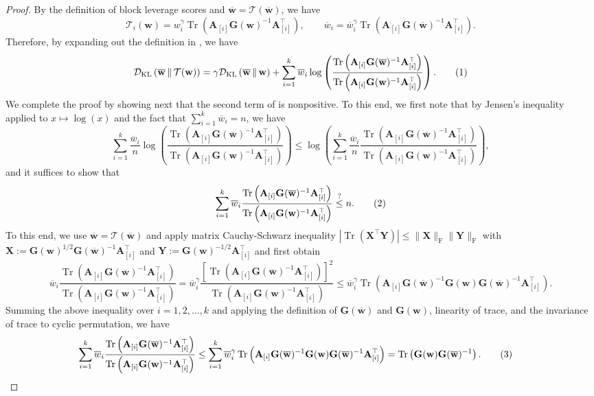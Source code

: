 \documentclass[11pt]{article}
\newcommand\numberthis{\addtocounter{equation}{1}\tag{\theequation}}
\theoremstyle{plain}
\numberwithin{equation}{section}
\newcommand{\Tr}{\operatorname{Tr}}
\newcommand{\bG}{\mathbf{G}}
\newcommand{\bX}{\mathbf{X}}
\newcommand{\bY}{\mathbf{Y}}
\newcommand{\bw}{\mathbf{w}}
\newcommand{\bwbar}{\overline{\mathbf{w}}}
\newcommand{\bAblk}[1]{\mathbf{A}_{[#1]}}
\newcommand{\wbar}{\overline{w}}
\newcommand{\calT}{\mathcal{T}}
\newcommand{\omrp}{\gamma}
\newcommand{\kldiv}[2]{\mathcal{D}_{\mathrm{KL}}\left(#1 \,\|\, #2\right)}
\begin{document}
\begin{proof}
By  the definition of block leverage scores and $\bwbar=\calT(\bwbar)$, we have \[ \calT_i(\bw)=w_i^\omrp \Tr\left(\bAblk{i}\bG(\bw)^{-1}\bAblk{i}^\top\right), \qquad \wbar_i = \wbar_i^{\omrp} \Tr\left(\bAblk{i}\bG(\bwbar)^{-1}\bAblk{i}^\top\right).\] Therefore, by expanding out the definition in , we have \[\kldiv{\bwbar}{\calT(\bw)} = \omrp \kldiv{\bwbar}{\bw} + \sum_{i = 1}^k \wbar_i \log\left(\frac{\Tr\left(\bAblk{i}\bG(\bwbar)^{-1}\bAblk{i}^\top\right)}{\Tr\left(\bAblk{i}\bG(\bw)^{-1}\bAblk{i}^\top\right)}\right). \numberthis\label{eq:KLcon-2}\] We  complete the  proof  by showing next that the second term of  is nonpositive. To this end, we first note that by Jensen's inequality applied to $x\mapsto\log(x)$ and the fact that $\sum_{i=1}^k \wbar_i = n$, we have  \[ \sum_{i = 1}^k \frac{\wbar_i}{n} \log\left(\frac{\Tr\left(\bAblk{i}\bG(\bwbar)^{-1}\bAblk{i}^\top\right)}{\Tr\left(\bAblk{i}\bG(\bw)^{-1}\bAblk{i}^\top\right)}\right) \leq \log\left( \sum_{i=1}^k \frac{\wbar_i}{n} \frac{\Tr\left(\bAblk{i}\bG(\bwbar)^{-1}\bAblk{i}^\top\right)}{\Tr\left(\bAblk{i}\bG(\bw)^{-1}\bAblk{i}^\top\right)} \right),\] and it  suffices to show that \[\sum_{i=1}^k {\wbar_i} \frac{\Tr\left(\bAblk{i}\bG(\bwbar)^{-1}\bAblk{i}^\top\right)}{\Tr\left(\bAblk{i}\bG(\bw)^{-1}\bAblk{i}^\top\right)} \stackrel{?}{\leq} n.\numberthis\label{eq:KLcon-3}\]To this end, we use $\bwbar=\calT(\bwbar)$ and apply matrix Cauchy-Schwarz inequality $\left|\Tr\left(\bX^\top\bY\right)\right|\leq \|\bX\|_{\mathrm{F}}\|\bY\|_{\mathrm{F}}$ with $\bX:=\bG(\bw)^{1/2}\bG(\bwbar)^{-1}\bAblk{i}^\top$ and $\bY:= \bG(\bw)^{-1/2}\bAblk{i}^\top$ and first obtain \[\wbar_i \frac{\Tr\left(\bAblk{i} \bG(\bwbar)^{-1}\bAblk{i}^\top\right)}{\Tr\left(\bAblk{i} \bG(\bw)^{-1}\bAblk{i}^\top\right)} = \wbar_i^{\omrp} \frac{\left[\Tr \left(\bAblk{i}\bG(\bwbar)^{-1}\bAblk{i}^\top\right)\right]^2}{\Tr\left(\bAblk{i}\bG(\bw)^{-1}\bAblk{i}^\top\right)} \leq \wbar_i^{\omrp} \Tr\left(\bAblk{i} \bG(\bwbar)^{-1}\bG(\bw)  \bG(\bwbar)^{-1} \bAblk{i}^\top\right).\] Summing the above inequality over $i = 1, 2, \dotsc, k$ and applying the definition of $\bG(\bwbar)$ and $\bG(\bw)$, linearity of trace, and the invariance of trace to cyclic permutation, we have
\begin{align*}
\sum_{i=1}^k \wbar_i\frac{\Tr\left(\bAblk{i}\bG(\bwbar)^{-1}\bAblk{i}^\top\right)}{\Tr\left(\bAblk{i}\bG(\bw)^{-1}\bAblk{i}^\top\right)} &\leq \sum_{i=1}^k \wbar_i^\omrp \Tr\left(\bAblk{i}\bG(\bwbar)^{-1}\bG(\bw) \bG(\bwbar)^{-1} \bAblk{i}^\top\right)= \Tr\left(\bG(\bw)\bG(\bwbar)^{-1}\right).\numberthis\label{eq:KLcon-4}

\end{align*}
\end{proof}
\end{document}
